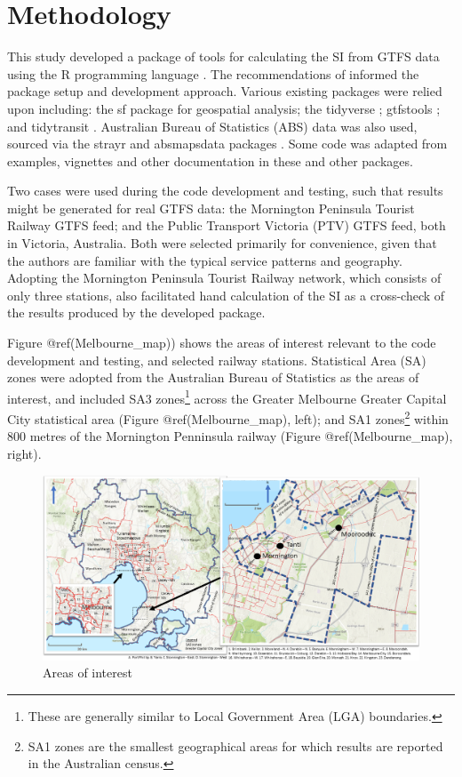 \documentclass[preprint, 3p,
authoryear]{elsarticle} %
\begin{document}
\section{Methodology}\label{methodology}

This study developed a package of tools for calculating the SI from GTFS
data using the R programming language \citep{R-base}. The
recommendations of \citet{wickham2023r} informed the package setup and
development approach. Various existing packages were relied upon
including: the sf package \citep{R-sf} for geospatial analysis; the
tidyverse \citep{tidyverse2019}; gtfstools \citep{R-gtfstools}; and
tidytransit \citep{R-tidytransit}. Australian Bureau of Statistics (ABS)
data was also used, sourced via the strayr and absmapsdata packages
\citep{r-strayr}. Some code was adapted from examples, vignettes and
other documentation in these and other packages.

Two cases were used during the code development and testing, such that
results might be generated for real GTFS data: the Mornington Peninsula
Tourist Railway GTFS feed; and the Public Transport Victoria (PTV) GTFS
feed, both in Victoria, Australia. Both were selected primarily for
convenience, given that the authors are familiar with the typical
service patterns and geography. Adopting the Mornington Peninsula
Tourist Railway network, which consists of only three stations, also
facilitated hand calculation of the SI as a cross-check of the results
produced by the developed package.

Figure @ref(Melbourne\_map)) shows the areas of interest relevant to the
code development and testing, and selected railway stations. Statistical
Area (SA) zones were adopted from the Australian Bureau of Statistics
\citep{ABSmaps} as the areas of interest, and included SA3
zones\footnote{These are generally similar to Local Government Area
  (LGA) boundaries.} across the Greater Melbourne Greater Capital City
statistical area (Figure @ref(Melbourne\_map), left); and SA1
zones\footnote{SA1 zones are the smallest geographical areas for which
  results are reported in the Australian census.} within 800 metres of
the Mornington Penninsula railway (Figure @ref(Melbourne\_map), right).

\begin{figure}
\includegraphics[width=1\linewidth]{graphics/all_maps} \caption{Areas of interest}\label{fig:Melbourne_map}
\end{figure}
\end{document}
